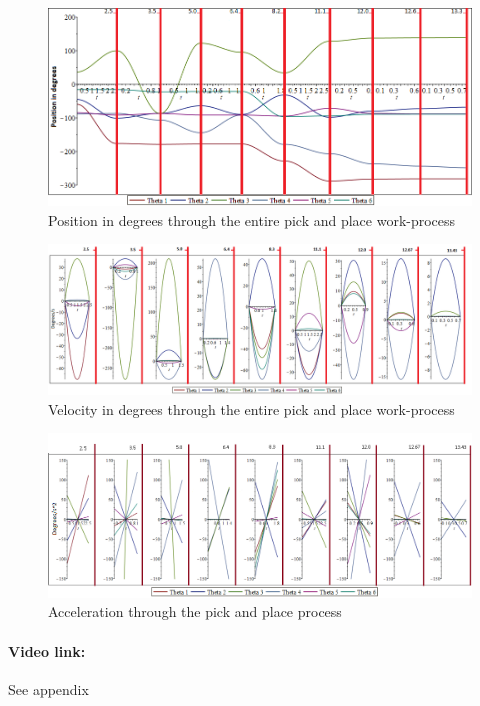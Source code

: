 \begin{figure}[H]
    \includegraphics[width=\textwidth]{Design/Positionsgraf.png}
    \caption{Position in degrees through the entire pick and place work-process}
    \label{fig:posCyc}
\end{figure}
\begin{figure}[H]
    \includegraphics[width = \textwidth]{Design/cycletimevel.png}
    \caption{Velocity in degrees through the entire pick and place work-process}
    \label{fig:velCyc}
\end{figure}
\begin{figure}[H]
    \includegraphics[width=\textwidth]{Design/accelerationtrajectory.png}
    \caption{Acceleration through the pick and place process}
    \label{fig:accCyc}
\end{figure}
\paragraph{Video link: }
See appendix \cite{testfilm}

